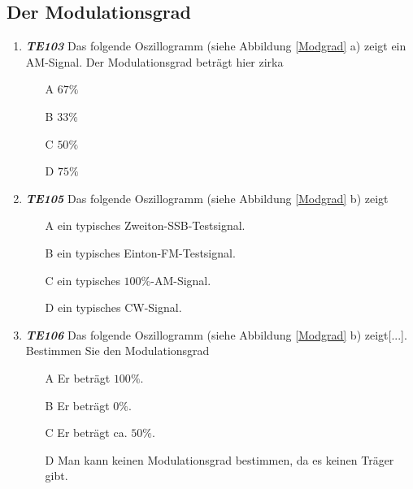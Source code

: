 \subsection*{Der Modulationsgrad}

\begin{enumerate} 
	\item \emph{\textbf{TE103}}  Das folgende Oszillogramm (siehe Abbildung \ref{Modgrad} a) zeigt ein AM-Signal. Der Modulationsgrad beträgt hier zirka
	\begin{enumerate}
	\itemsep1pt\parskip0pt
		\item[A] $67\%$
		\item[B] $33\%$
		\item[C] $50\%$
		\item[D] $75\%$
	\end{enumerate} 
	\item \emph{\textbf{TE105}}   Das folgende Oszillogramm (siehe Abbildung \ref{Modgrad} b) zeigt
	\begin{enumerate}
	\itemsep1pt\parskip0pt
		\item[A] ein typisches Zweiton-SSB-Testsignal.
		\item[B] ein typisches Einton-FM-Testsignal.
		\item[C] ein typisches $100\%$-AM-Signal.
		\item[D] ein typisches CW-Signal.
	\end{enumerate} 
	\item \emph{\textbf{TE106}}   Das folgende Oszillogramm (siehe Abbildung \ref{Modgrad} b) zeigt[...]. Bestimmen Sie den Modulationsgrad
	\begin{enumerate}
	\itemsep1pt\parskip0pt
		\item[A] Er beträgt $100\%$.
		\item[B] Er beträgt $0\%$.
		\item[C] Er beträgt ca. $50\%$.
		\item[D] Man kann keinen Modulationsgrad bestimmen, da es keinen Träger gibt.
	\end{enumerate} 
\end{enumerate} 

